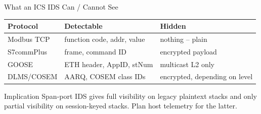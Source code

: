 \documentclass[aspectratio=169,11pt]{beamer}
\begin{document}
\begin{frame}{What an ICS IDS Can / Cannot See}
\centering
\renewcommand{\arraystretch}{1.3}
\footnotesize
\setlength{\tabcolsep}{3pt}
\begin{tabular}{|p{3.4cm}|p{4.4cm}|p{4.4cm}|}
\hline
\rowcolor{slidePanel}
\textbf{Protocol} & \textbf{Detectable} & \textbf{Hidden} \\
\hline
Modbus TCP   & function code, addr, value & nothing -- plain \\
S7commPlus   & frame, command ID          & encrypted payload \\
GOOSE        & ETH header, AppID, stNum   & multicast L2 only \\
DLMS/COSEM   & AARQ, COSEM class IDs      & encrypted, depending on level \\
\hline
\end{tabular}
\vspace{2mm}
\begin{notebox}{Implication}
Span-port IDS gives full visibility on legacy plaintext stacks and only partial visibility on session-keyed stacks. Plan host telemetry for the latter.
\end{notebox}
\end{frame}
\end{document}
